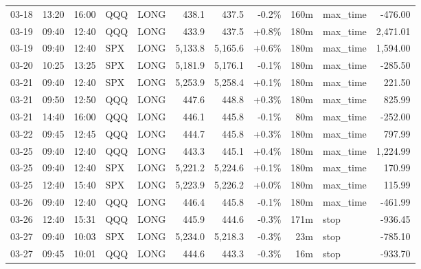 \documentclass[11pt,a4paper,twoside]{article}
\begin{document}
\begin{center}
\begin{longtable}{>{\color{txtmain}}l l l l l r r r r >{\color{txtmain}}l r}
03-18 & 13:20 & 16:00 & QQQ & LONG & 438.1 & 437.5 & \textcolor{lossred}{-0.2\%} & 160m & max\_time & \textcolor{lossred}{-476.00} \\
03-19 & 09:40 & 12:40 & QQQ & LONG & 433.9 & 437.5 & \textcolor{wingreen}{+0.8\%} & 180m & max\_time & \textcolor{wingreen}{2,471.01} \\
03-19 & 09:40 & 12:40 & SPX & LONG & 5,133.8 & 5,165.6 & \textcolor{wingreen}{+0.6\%} & 180m & max\_time & \textcolor{wingreen}{1,594.00} \\
03-20 & 10:25 & 13:25 & SPX & LONG & 5,181.9 & 5,176.1 & \textcolor{lossred}{-0.1\%} & 180m & max\_time & \textcolor{lossred}{-285.50} \\
03-21 & 09:40 & 12:40 & SPX & LONG & 5,253.9 & 5,258.4 & \textcolor{wingreen}{+0.1\%} & 180m & max\_time & \textcolor{wingreen}{221.50} \\
03-21 & 09:50 & 12:50 & QQQ & LONG & 447.6 & 448.8 & \textcolor{wingreen}{+0.3\%} & 180m & max\_time & \textcolor{wingreen}{825.99} \\
03-21 & 14:40 & 16:00 & QQQ & LONG & 446.1 & 445.8 & \textcolor{lossred}{-0.1\%} & 80m & max\_time & \textcolor{lossred}{-252.00} \\
03-22 & 09:45 & 12:45 & QQQ & LONG & 444.7 & 445.8 & \textcolor{wingreen}{+0.3\%} & 180m & max\_time & \textcolor{wingreen}{797.99} \\
03-25 & 09:40 & 12:40 & QQQ & LONG & 443.3 & 445.1 & \textcolor{wingreen}{+0.4\%} & 180m & max\_time & \textcolor{wingreen}{1,224.99} \\
03-25 & 09:40 & 12:40 & SPX & LONG & 5,221.2 & 5,224.6 & \textcolor{wingreen}{+0.1\%} & 180m & max\_time & \textcolor{wingreen}{170.99} \\
03-25 & 12:40 & 15:40 & SPX & LONG & 5,223.9 & 5,226.2 & \textcolor{wingreen}{+0.0\%} & 180m & max\_time & \textcolor{wingreen}{115.99} \\
03-26 & 09:40 & 12:40 & QQQ & LONG & 446.4 & 445.8 & \textcolor{lossred}{-0.1\%} & 180m & max\_time & \textcolor{lossred}{-461.99} \\
03-26 & 12:40 & 15:31 & QQQ & LONG & 445.9 & 444.6 & \textcolor{lossred}{-0.3\%} & 171m & stop & \textcolor{lossred}{-936.45} \\
03-27 & 09:40 & 10:03 & SPX & LONG & 5,234.0 & 5,218.3 & \textcolor{lossred}{-0.3\%} & 23m & stop & \textcolor{lossred}{-785.10} \\
03-27 & 09:45 & 10:01 & QQQ & LONG & 444.6 & 443.3 & \textcolor{lossred}{-0.3\%} & 16m & stop & \textcolor{lossred}{-933.70} \\

\end{longtable}
\end{center}
\end{document}
